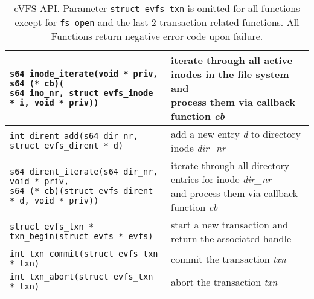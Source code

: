 \begin{table*}
\begin{center}
\begin{small}
\begin{tabular}[t]{|l|l|}
\makecell[l]{\texttt{s64 inode\_iterate(void * priv, s64 (* cb)(} \\ 
\hspace{1em}\texttt{s64 ino\_nr, struct evfs\_inode * i, void * priv))}} & \makecell[l]{iterate through all active inodes in the file system and \\ process them via callback function \textit{cb}} \\
\hline
\hline
\texttt{int dirent\_add(s64 dir\_nr, struct evfs\_dirent * d)} & add a new entry \textit{d} to directory inode \textit{dir\_nr} \\
\hline 
\makecell[l]{\texttt{s64 dirent\_iterate(s64 dir\_nr, void * priv,} \\ 
\hspace{1em}\texttt{s64 (* cb)(struct evfs\_dirent * d, void * priv))}} & \makecell[l]{iterate through all directory entries for inode \textit{dir\_nr} \\ and process them via callback function \textit{cb}} \\
\hline
\hline
\texttt{struct evfs\_txn * txn\_begin(struct evfs * evfs)} & start a new transaction and return the associated handle \\
\hline 
\texttt{int txn\_commit(struct evfs\_txn * txn)} & commit the transaction \textit{txn} \\
\hline 
\texttt{int txn\_abort(struct evfs\_txn * txn)} & abort the transaction \textit{txn} \\
\hline
\end{tabular}
\end{small}
\par\end{center}
\vspace{-15pt}
\caption{\label{tab:evfs-api}eVFS API. Parameter \texttt{struct evfs\_txn} is omitted for all functions except for \texttt{fs\_open} and the last 2 transaction-related functions. All Functions return negative error code upon failure.}
\vspace{-6pt}
\end{table*}


